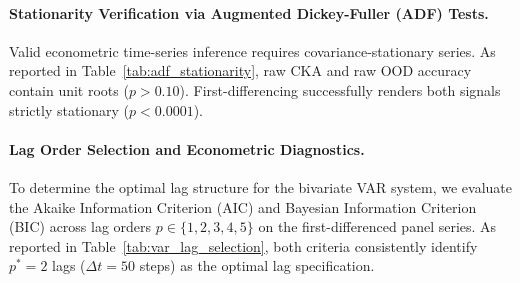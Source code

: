 \documentclass{article}
\theoremstyle{plain}
\theoremstyle{definition}
\begin{document}
\paragraph{Stationarity Verification via Augmented Dickey-Fuller (ADF) Tests.}
Valid econometric time-series inference requires covariance-stationary series. As reported in Table~\ref{tab:adf_stationarity}, raw CKA and raw OOD accuracy contain unit roots ($p > 0.10$). First-differencing successfully renders both signals strictly stationary ($p < 0.0001$).

\begin{table}[h]
\centering
\caption{\textbf{Augmented Dickey-Fuller (ADF) Unit-Root Stationarity Tests.}}
\label{tab:adf_stationarity}
\vskip 0.1in
\begin{small}
\begin{sc}
\end{sc}
\end{small}
\end{table}

\paragraph{Lag Order Selection and Econometric Diagnostics.}
To determine the optimal lag structure for the bivariate VAR system, we evaluate the Akaike Information Criterion (AIC) and Bayesian Information Criterion (BIC) across lag orders $p \in \{1, 2, 3, 4, 5\}$ on the first-differenced panel series. As reported in Table~\ref{tab:var_lag_selection}, both criteria consistently identify $p^* = 2$ lags ($\Delta t = 50$ steps) as the optimal lag specification.
\end{document}
